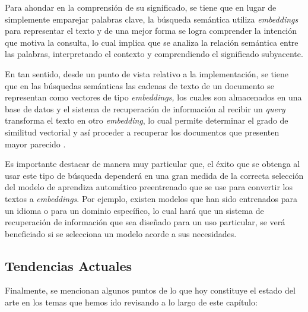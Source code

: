 \documentclass[
  12pt,
  openany]{book}
\begin{document}
Para ahondar en la comprensión de su significado, se tiene que en lugar de simplemente emparejar palabras clave, la búsqueda semántica utiliza \emph{embeddings} para representar el texto y de una mejor forma se logra comprender la intención que motiva la consulta, lo cual implica que se analiza la relación semántica entre las palabras, interpretando el contexto y comprendiendo el significado subyacente.

En tan sentido, desde un punto de vista relativo a la implementación, se tiene que en las búsquedas semánticas las cadenas de texto de un documento se representan como vectores de tipo \emph{embeddings,} los cuales son almacenados en una base de datos y el sistema de recuperación de información al recibir un \emph{query} transforma el texto en otro \emph{embedding}, lo cual permite determinar el grado de similitud vectorial y así proceder a recuperar los documentos que presenten mayor parecido \citep{muennighoff2022a}.

Es importante destacar de manera muy particular que, el éxito que se obtenga al usar este tipo de búsqueda dependerá en una gran medida de la correcta selección del modelo de aprendiza automático preentrenado que se use para convertir los textos a \emph{embeddings}. Por ejemplo, existen modelos que han sido entrenados para un idioma o para un dominio específico, lo cual hará que un sistema de recuperación de información que sea diseñado para un uso particular, se verá beneficiado si se selecciona un modelo acorde a sus necesidades.

\hypertarget{tendencias-actuales}{%
\subsection{Tendencias Actuales}\label{tendencias-actuales}}

Finalmente, se mencionan algunos puntos de lo que hoy constituye el estado del arte en los temas que hemos ido revisando a lo largo de este capítulo:
\end{document}
